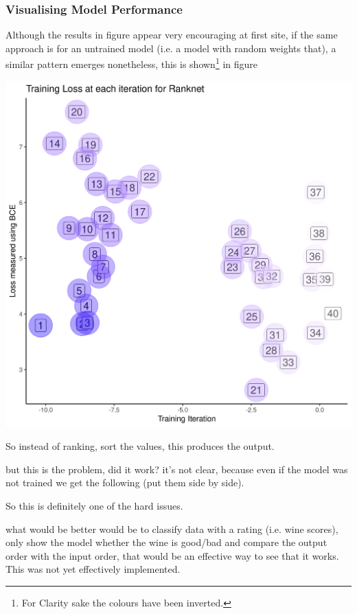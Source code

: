 \documentclass[a4paper,11pt,twoside]{article}
\begin{document}
\subsubsection{Visualising Model Performance}
\label{sec:orge650752}
Although the results in figure appear very
encouraging at first site, if the same approach is for an
untrained model (i.e. a model with random weights that), a similar
pattern emerges nonetheless, this is shown\footnote{For Clarity sake the colours have been inverted.} in figure 


\begin{center}
\includegraphics[width=.9\linewidth]{media/ordered_blobs_untrained.png}
\end{center}







So instead of ranking, sort the values, this produces the output.

but this is the problem, did it work? it's not clear, because even
if the model was not trained we get the following (put them side by side).

So this is definitely one of the hard issues.

what would be better would be to classify data with a rating
(i.e. wine scores), only show the model whether the wine is
good/bad and compare the output order with the input order, that
would be an effective way to see that it works. This was not yet
effectively implemented.
\end{document}

